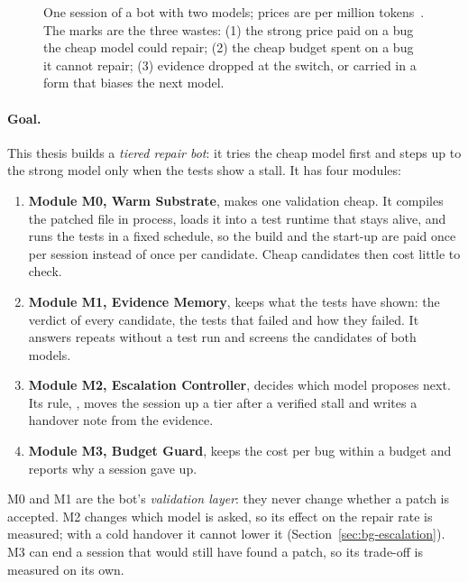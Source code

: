 \begin{figure}[htbp]
{}
\caption[One session of a bot with two models.]{One session of a bot with two
models; prices are per million tokens~\citep{aibusiness2026gpt6}. The marks are
the three wastes: (1) the strong price paid on a bug the cheap model could
repair; (2) the cheap budget spent on a bug it cannot repair; (3) evidence
dropped at the switch, or carried in a form that biases the next model.}
\label{fig:intro-wastes}
\end{figure}

\paragraph{Goal.} This thesis builds a \emph{tiered repair bot}: it tries the
cheap model first and steps up to the strong model only when the tests show a
stall. It has four modules:
\begin{enumerate}
\item \textbf{Module M0, Warm Substrate}, makes one validation cheap. It
compiles the patched file in process, loads it into a test runtime that stays
alive, and runs the tests in a fixed schedule, so the build and the start-up
are paid once per session instead of once per candidate. Cheap candidates then
cost little to check.
\item \textbf{Module M1, Evidence Memory}, keeps what the tests have shown:
the verdict of every candidate, the tests that failed and how they failed. It
answers repeats without a test run and screens the candidates of both models.
\item \textbf{Module M2, Escalation Controller}, decides which model proposes
next. Its rule, \Step, moves the session up a tier after a verified stall and
writes a handover note from the evidence.
\item \textbf{Module M3, Budget Guard}, keeps the cost per bug within a budget
and reports why a session gave up.
\end{enumerate}
M0 and M1 are the bot's \emph{validation layer}: they never change whether a
patch is accepted. M2 changes which model is asked, so its effect on the
repair rate is measured; with a cold handover it cannot lower it (Section~\ref{sec:bg-escalation}). M3 can end a session that
would still have found a patch, so its trade-off is measured on its own.


